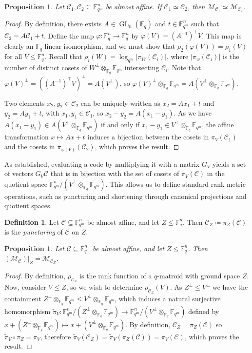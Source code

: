 \documentclass[a4paper,11pt,reqno]{article}
\newcommand{\F}{\mathbb{F}}
\newcommand{\M}{\mathcal{M}}
\newcommand{\C}{\mathcal{C}}
\newcommand{\GL}{\operatorname{GL}}
\theoremstyle{plain} \numberwithin{equation}{section}
\newtheorem{proposition}[theorem]{Proposition}
\theoremstyle{definition}
\newtheorem{definition}[theorem]{Definition}
\renewcommand{\phi}{\varphi}
\begin{document}
\begin{proposition}\label{prop:equivalence}
Let $\C_1,\C_2\subseteq \F_{q^m}^n$ be almost affine. If $\C_1\simeq \C_2$, then $\M_{\C_1} \simeq \M_{\C_2}$.
\end{proposition}
\begin{proof}
By definition, there exists $A\in \GL_n(\F_q)$ and $t\in \F_{q^m}^n$ such that $\C_2 = A\C_1+t$. Define the map $\phi \colon \F_q^n\rightarrow \F_q^n$ by $\phi(V)= (A^{-1})^\top V$. This map is clearly an $\F_q$-linear isomorphism, and we must show that $\rho_2(\phi(V)) = \rho_1(V)$ for all $V\leq \F_q^n$. Recall that $\rho_i(W) = \log_{q^m} |\pi_W(\C_i)|$, where $|\pi_w(\C_i)|$ is the number of distinct cosets of $W^\perp \otimes_{\F_q}\F_{q^m}$ intersecting $\C_i$. Note that $\phi(V)^\perp = ((A^{-1})^\top V)^\perp = A(V^\perp)$, so $\phi(V)^\perp \otimes_{\F_q}\F_{q^m} = A(V^\perp \otimes_{\F_q}\F_{q^m})$.

Two elements $x_2,y_2\in \C_2$ can be uniquely written as $x_2 = Ax_1+t$ and $y_2 = Ay_1 + t$, with $x_1,y_1\in \C_1$, so $x_2-y_2 = A(x_1-y_1)$. As we have $A(x_1-y_1) \in A(V^\perp \otimes_{\F_q}\F_{q^m})$ if and only if $x_1-y_1 \in V^\perp \otimes_{\F_q}\F_{q^m}$, the affine transformation $x\mapsto Ax+t$ induces a bijection between the cosets in $\pi_V(\C_1)$ and the cosets in $\pi_{\phi(V)}(\C_2)$, which proves the result.
\end{proof}

As established, evaluating a code by multiplying it with a matrix $G_V$ yields a set of vectors $G_V\C$ that is in bijection with the set of cosets of $\pi_V(\C)$ in the quotient space $\F_{q^m}^n/(V^\perp \otimes_{\F_q}\F_{q^m})$. This allows us to define standard rank-metric operations, such as puncturing and shortening through canonical projections and quotient spaces.

\begin{definition}
    Let $\C\subseteq \F_{q^m}^n$ be almost affine, and let $Z\leq \F_q^n$. Then $\C_Z\coloneqq \pi_Z(\C)$ is the \emph{puncturing} of $\C$ on $Z$.
\end{definition}

\begin{proposition}
Let $\C\subseteq \F_{q^m}^n$ be almost affine, and let $Z\leq \F_q^n$. Then $(\M_\C)|_Z = \M_{\C_Z}$.
\end{proposition}
\begin{proof}
    By definition, $\rho_{\C_Z}$ is the rank function of a $q$-matroid with ground space $Z$. Now, consider $V\leq Z$, so we wish to determine $\rho_{\C_Z}(V)$. As $Z^\perp \leq V^\perp$ we have the containment $Z^\perp \otimes_{\F_q}\F_{q^m} \leq V^\perp \otimes_{\F_q}\F_{q^m}$, which induces a natural surjective homomorphism $\tilde{\pi}_V\colon \F_{q^m}^n/(Z^\perp \otimes_{\F_q}\F_{q^m})\rightarrow \F_{q^m}^n/(V^\perp \otimes_{\F_q}\F_{q^m})$ defined by $x + (Z^\perp \otimes_{\F_q}\F_{q^m}) \mapsto x + (V^\perp \otimes_{\F_q}\F_{q^m})$. By definition, $\C_Z = \pi_Z(\C)$ so $\tilde{\pi}_V \circ \pi_Z = \pi_V$, therefore $\tilde{\pi}_V(\C_Z) = \tilde{\pi}_V(\pi_Z(\C)) = \pi_V(\C)$, which proves the result. 
\end{proof}
\end{document}

